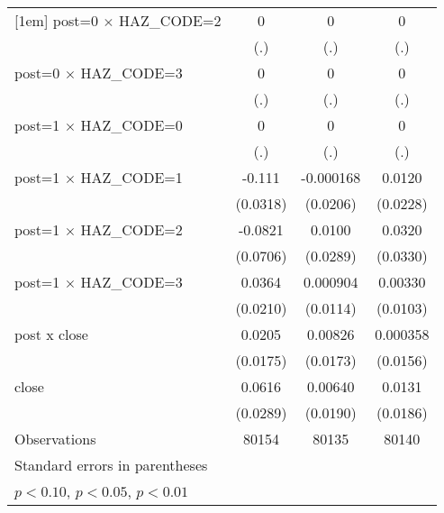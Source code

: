 \begin{table}[htbp]
\begin{tabular}{l*{3}{c}}
[1em]
post=0 $\times$ HAZ\_CODE=2&           0         &           0         &           0         \\
                    &         (.)         &         (.)         &         (.)         \\
[1em]
post=0 $\times$ HAZ\_CODE=3&           0         &           0         &           0         \\
                    &         (.)         &         (.)         &         (.)         \\
[1em]
post=1 $\times$ HAZ\_CODE=0&           0         &           0         &           0         \\
                    &         (.)         &         (.)         &         (.)         \\
[1em]
post=1 $\times$ HAZ\_CODE=1&      -0.111\sym{***}&   -0.000168         &      0.0120         \\
                    &    (0.0318)         &    (0.0206)         &    (0.0228)         \\
[1em]
post=1 $\times$ HAZ\_CODE=2&     -0.0821         &      0.0100         &      0.0320         \\
                    &    (0.0706)         &    (0.0289)         &    (0.0330)         \\
[1em]
post=1 $\times$ HAZ\_CODE=3&      0.0364         &    0.000904         &     0.00330         \\
                    &    (0.0210)         &    (0.0114)         &    (0.0103)         \\
[1em]
post x close        &      0.0205         &     0.00826         &    0.000358         \\
                    &    (0.0175)         &    (0.0173)         &    (0.0156)         \\
[1em]
close               &      0.0616\sym{**} &     0.00640         &      0.0131         \\
                    &    (0.0289)         &    (0.0190)         &    (0.0186)         \\
\hline
Observations        &       80154         &       80135         &       80140         \\
\hline\hline
\multicolumn{4}{l}{\footnotesize Standard errors in parentheses}\\
\multicolumn{4}{l}{\footnotesize \sym{*} \(p<0.10\), \sym{**} \(p<0.05\), \sym{***} \(p<0.01\)}\\
\end{tabular}
\end{table}
